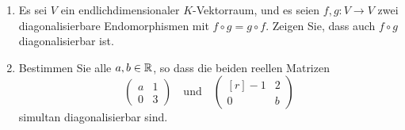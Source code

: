\documentclass[a4paper, 10pt]{scrartcl}
\begin{document}
\begin{question}[subtitle = Simultane Diagonalisierbarkeit]
  \begin{enumerate}
    \item
      Es sei $V$ ein endlichdimensionaler $K$-Vektorraum, und es seien $f, g \colon V \to V$ zwei diagonalisierbare Endomorphismen mit $f \circ g = g \circ f$.
      Zeigen Sie, dass auch $f \circ g$ diagonalisierbar ist.
    \item
      Bestimmen Sie alle $a, b \in \mathbb{R}$, so dass die beiden reellen Matrizen
      \[
        \begin{pmatrix}
          a & 1 \\
          0 & 3
        \end{pmatrix}
        \quad\text{und}\quad
        \begin{pmatrix*}[r]
          -1  & 2 \\
           0  & b
        \end{pmatrix*}
      \]
      simultan diagonalisierbar sind.
      
  \end{enumerate}
\end{question}
\end{document}
